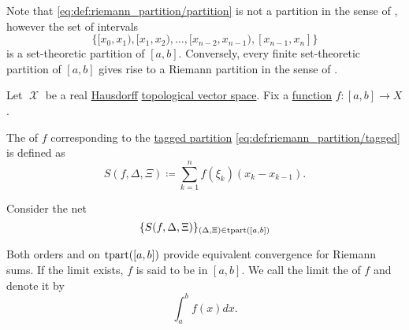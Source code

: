\begin{remark}\label{rem:set_and_riemann_partitions}
  Note that \eqref{eq:def:riemann_partition/partition} is not a partition in the sense of , however the set of intervals
  \begin{equation*}
    \Big\{ [x_0, x_1), [x_1, x_2), \ldots, [x_{n-2}, x_{n-1}), [x_{n-1}, x_n] \Big\}
  \end{equation*}
  is a set-theoretic partition of \( [a, b] \). Conversely, every finite set-theoretic partition of \( [a, b] \) gives rise to a Riemann partition in the sense of .
\end{remark}

\begin{definition}\label{def:riemann_integral}
  Let \( \mscrX \) be a real \hyperref[def:separation_axioms/T2]{Hausdorff} \hyperref[def:topological_vector_space]{topological vector space}. Fix a \hyperref[def:function]{function} \( f: [a, b] \to X \).

  The  of \( f \) corresponding to the \hyperref[def:riemann_partition/tagged]{tagged partition} \eqref{eq:def:riemann_partition/tagged} is defined as
  \begin{equation*}
    S(f, \Delta, \Xi) \coloneqq \sum_{k=1}^n f(\xi_k) (x_k - x_{k-1}).
  \end{equation*}

  Consider the net
  \begin{equation}\label{eq:def:riemann_integral/net}
    \{ S(f, \Delta, \Xi) \}_{(\Delta, \Xi) \in \operatorname{tpart}([a, b])}
  \end{equation}

  Both orders  and  on \( \operatorname{tpart}([a, b]) \) provide equivalent convergence for Riemann sums. If the limit exists, \( f \) is said to be  in \( [a, b] \). We call the limit the  of \( f \) and denote it by
  \begin{equation}\label{eq:def:riemann_integral}
    \int_a^b f(x) dx.
  \end{equation}
\end{definition}
